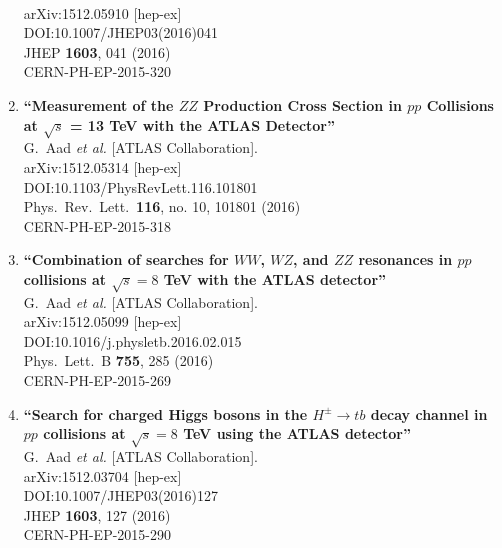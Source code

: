 \documentclass{article}
\begin{document}
\begin{enumerate}
  \\{}arXiv:1512.05910 [hep-ex]
  \\{}DOI:10.1007/JHEP03(2016)041
  \\{}JHEP {\bf 1603}, 041 (2016)
  \\{}CERN-PH-EP-2015-320
\item%
{\bf ``Measurement of the $ZZ$ Production Cross Section in $pp$ Collisions at $\sqrt{s}$ = 13 TeV with the ATLAS Detector''}
  \\{}G.~Aad {\it et al.} [ATLAS Collaboration].
  \\{}arXiv:1512.05314 [hep-ex]
  \\{}DOI:10.1103/PhysRevLett.116.101801
  \\{}Phys.\ Rev.\ Lett.\  {\bf 116}, no. 10, 101801 (2016)
  \\{}CERN-PH-EP-2015-318
\item%
{\bf ``Combination of searches for $WW$, $WZ$, and $ZZ$ resonances in $pp$ collisions at $\sqrt{s} = 8$ TeV with the ATLAS detector''}
  \\{}G.~Aad {\it et al.} [ATLAS Collaboration].
  \\{}arXiv:1512.05099 [hep-ex]
  \\{}DOI:10.1016/j.physletb.2016.02.015
  \\{}Phys.\ Lett.\ B {\bf 755}, 285 (2016)
  \\{}CERN-PH-EP-2015-269
\item%
{\bf ``Search for charged Higgs bosons in the $H^{\pm} \rightarrow tb$ decay channel in $pp$ collisions at $\sqrt{s}=8 $ TeV using the ATLAS detector''}
  \\{}G.~Aad {\it et al.} [ATLAS Collaboration].
  \\{}arXiv:1512.03704 [hep-ex]
  \\{}DOI:10.1007/JHEP03(2016)127
  \\{}JHEP {\bf 1603}, 127 (2016)
  \\{}CERN-PH-EP-2015-290

\end{enumerate}
\end{document}
